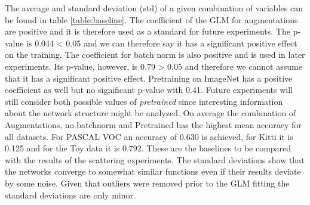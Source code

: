 The average and standard deviation (std) of a given combination of variables can be found in table \ref{table:baseline}. The coefficient of the GLM for augmentations are positive and it is therefore used as a standard for future experiments. The p-value is 0.044 < 0.05 and we can therefore say it has a significant positive effect on the training. The coefficient for batch norm is also positive and is used in later experiments. Its p-value, however, is 0.79 > 0.05 and therefore we cannot assume that it has a significant positive effect. Pretraining on ImageNet has a positive coefficient as well but no significant p-value with 0.41. Future experiments will still consider both possible values of \textit{pretrained} since interesting information about the network structure might be analyzed. On average the combination of Augmentations, no batchnorm and Pretrained has the highest mean accuracy for all datasets. For PASCAL VOC an accuracy of 0.630 is achieved, for Kitti it is 0.125 and for the Toy data it is 0.792. These are the baselines to be compared with the results of the scattering experiments. The standard deviations show that the networks converge to somewhat similar functions even if their results deviate by some noise. Given that outliers were removed prior to the GLM fitting the standard deviations are only minor. 

